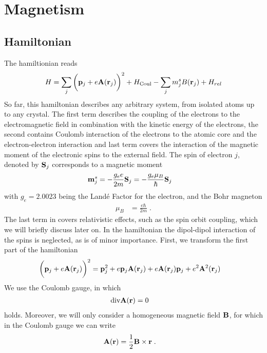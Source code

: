 
\chapter{Magnetism}

\section{Hamiltonian}

The hamiltionian reads
%
\begin{align}\label{eq:H:a}
H = \sum_{j}\bigg( \mathbf p_{j} + e \mathbf A(\mathbf r_{j}) \bigg)^{2} 
+ H_\text{Coul}- \sum_{j}  m^{s}_{j}B(\mathbf r_{j}) +H_{rel}
\end{align}
%
So far, this  hamiltonian describes any arbitrary system, from isolated atoms up to any crystal.
The first term describes the coupling of the electrons to the electromagnetic field in combination with  the kinetic energy of the electrons, the second contains Coulomb interaction of the electrons to the atomic core and the electron-electron interaction and last term covers the interaction of the magnetic moment of the electronic spins 
to the external field. The spin of electron $j$, denoted by $\mathbf S_{j}$ corresponds to a magnetic moment
%
\begin{align}\label{eq:magmo:spin}
\mathbf m_{j}^{s} &= - \frac{g_{e} e}{2m } \mathbf S_{j} 
= -\frac{g_{e} \mu_{B}}{\hbar  } \mathbf S_{j} 
\end{align}
%
with $g_{e}=2.0023$ being the Land\'e Factor for the electron,
and the Bohr magneton
%
\begin{align}
\mu_{B} &= \frac{e \hbar}{2m}\;.
\end{align}
%
The last term in  covers relativistic effects, such as the spin orbit coupling, which we will briefly discuss later on.
In the hamiltonian the dipol-dipol interaction of the spins is neglected, as is of minor importance.
First, we transform  the first part of the hamiltonian 
%
\begin{align*}
\bigg( \mathbf p_{j} + e \mathbf A(\mathbf r_{j}) \bigg)^{2} &= \mathbf p_{j}^{2} +e  \mathbf p_{j}  \mathbf A(\mathbf r_{j})
+e  \mathbf A (\mathbf r_{j}) \mathbf p_{j}  + e^{2}\mathbf A^{2}( \mathbf r_{j})
\end{align*}
%
We use the Coulomb gauge, in which
%
\begin{align*}
\text{div} \mathbf A(\mathbf r) &= 0
\end{align*}
%
holds. Moreover, we will only consider a homogeneous magnetic field
$\mathbf B$, for which in the Coulomb gauge we can write
%
\begin{align*}
\mathbf A(\mathbf r) &= \frac{1}{2}\mathbf B\times \mathbf r\;.
\end{align*}
